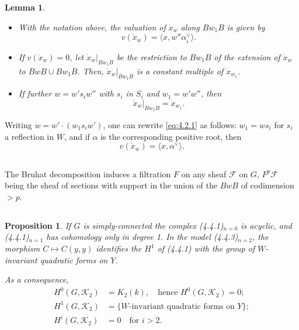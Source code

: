 \documentclass[11pt,a4paper]{article}
\theoremstyle{plain}
\newtheorem{lemma}[theorem]{Lemma}
\newtheorem{proposition}[theorem]{Proposition}
\theoremstyle{definition}
\newcommand{\cF}{\mathcal{F}}
\newcommand{\cK}{\mathcal{K}}
\begin{document}
\subsection{}

\begin{lemma}\label{lem:4.2}
\begin{itemize}
\item[(i)] With the notation above, the valuation of $\dot{x}_w$ along $Bw_1 B$ is given by
\begin{equation}\label{eq:4.2.1}
v(\dot{x}_w) = \langle x, w'' \alpha_i^\vee \rangle.
\end{equation}
\item[(ii)] If $v(\dot{x}_w) = 0$, let $\dot{x}_w|_{Bw_1 B}$ be the restriction to $Bw_1 B$ of the extension of $\dot{x}_w$ to $BwB \cup Bw_1 B$. Then, $\dot{x}_w|_{Bw_1 B}$ is a constant multiple of $\dot{x}_{w_1}$.
\item[(iii)] If further $w = w' s_i w''$ with $s_i$ in $S_i$ and $w_1 = w' w''$, then
\begin{equation}\label{eq:4.2.2}
\dot{x}_w|_{Bw_1 B} = \dot{x}_{w_1}.
\end{equation}
\end{itemize}
\end{lemma}

Writing $w = w' \cdot (w_1 s_i w')$, one can rewrite \eqref{eq:4.2.1} as follows: $w_1 = ws_i$ for $s_i$ a reflection in $W$, and if $\alpha$ is the corresponding positive root, then
\begin{equation}\label{eq:4.2.3}
v(\dot{x}_w) = \langle x, \alpha^\vee \rangle.
\end{equation}

\subsection{}
The Bruhat decomposition induces a filtration $F$ on any sheaf $\cF$ on $G$, $F^p \cF$ being the sheaf of sections with support in the union of the $BwB$ of codimension $> p$.

\subsection{}

\begin{proposition}\label{prop:4.6}
If $G$ is simply-connected the complex \textup{(4.4.1)}$_{n=0}$ is acyclic, and \textup{(4.4.1)}$_{n=1}$ has cohomology only in degree 1. In the model \textup{(4.4.3)}$_{n=2}$, the morphism $C \mapsto C(y,y)$ identifies the $H^1$ of \textup{(4.4.1)} with the group of $W$-invariant quadratic forms on $Y$.

As a consequence,
\begin{align}
H^0(G, \cK_2) &= K_2(k), \quad \text{hence } H^0(G, \cK_2) = 0; \label{eq:4.6.1} \\
H^1(G, \cK_2) &= \{\text{$W$-invariant quadratic forms on $Y$}\}; \label{eq:4.6.2} \\
H^i(G, \cK_2) &= 0 \quad \text{for } i > 2. \label{eq:4.6.3}
\end{align}
\end{proposition}
\end{document}
